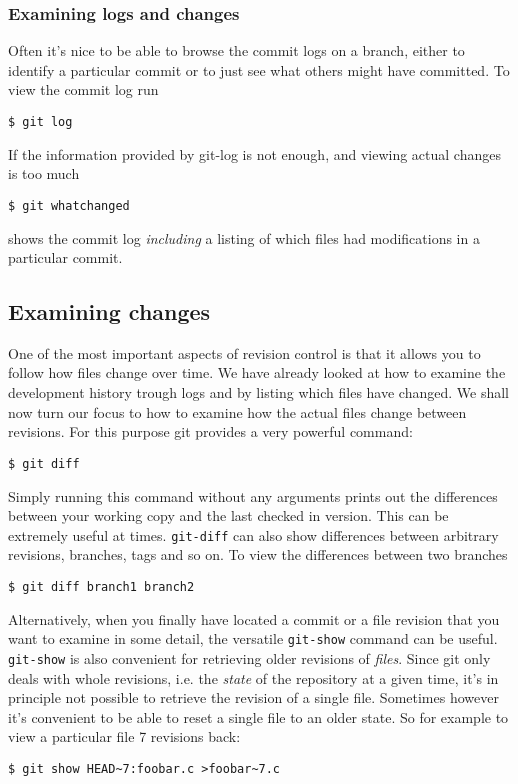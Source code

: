 \documentclass[a4paper,10pt]{article}
\begin{document}
\subsubsection{Examining logs and changes}
Often it's nice to be able to browse the commit logs on a branch, either
to identify a particular commit or to just see what others might have
committed. To view the commit log run
\begin{verbatim}
$ git log
\end{verbatim}
If the information provided by git-log is not enough, and viewing actual
changes is too much 
\begin{verbatim}
$ git whatchanged
\end{verbatim}
shows the commit log \emph{including} a listing of which files had
modifications in a particular commit. 

\subsection{Examining changes}
One of the most important aspects of revision control is that it allows you to
follow how files change over time. We have already looked at how to examine
the development history trough logs and by listing which files have changed.
We shall now turn our focus to how to examine how the actual files change
between revisions. For this purpose git provides a very powerful command:
\begin{verbatim}
$ git diff
\end{verbatim}
Simply running this command without any arguments prints out the differences
between your working copy and the last checked in version. This can be
extremely useful at times. \texttt{git-diff} can also show differences between
arbitrary revisions, branches, tags and so on. To view the differences
between two branches
\begin{verbatim}
$ git diff branch1 branch2
\end{verbatim}

Alternatively, when you finally have located a commit or a file revision that
you want to examine in some detail, the versatile \texttt{git-show} command
can be useful.  \texttt{git-show} is also convenient for retrieving older
revisions of \emph{files}. Since git only deals with whole revisions, i.e. the
\emph{state} of the repository at a given time, it's in principle not possible
to retrieve the revision of a single file. Sometimes however it's convenient
to be able to reset a single file to an older state.  So for example to view a
particular file 7 revisions back:
\begin{verbatim}
$ git show HEAD~7:foobar.c >foobar~7.c
\end{verbatim}
\end{document}
